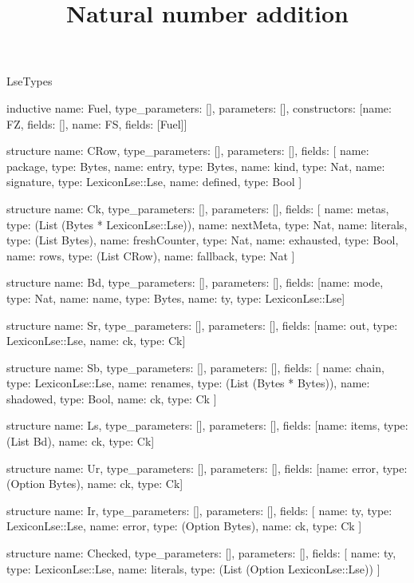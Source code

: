 \begin{lexlean}{LseTypes}
\title{Natural number addition}
\begin{semanticmodule}
inductive{
  name: Fuel,
  type_parameters: [],
  parameters: [],
  constructors: [{name: FZ, fields: []}, {name: FS, fields: [Fuel]}]
}

structure{
  name: CRow,
  type_parameters: [],
  parameters: [],
  fields: [
    {name: package, type: Bytes},
    {name: entry, type: Bytes},
    {name: kind, type: Nat},
    {name: signature, type: LexiconLse::Lse},
    {name: defined, type: Bool}
  ]
}

structure{
  name: Ck,
  type_parameters: [],
  parameters: [],
  fields: [
    {name: metas, type: (List (Bytes * LexiconLse::Lse))},
    {name: nextMeta, type: Nat},
    {name: literals, type: (List Bytes)},
    {name: freshCounter, type: Nat},
    {name: exhausted, type: Bool},
    {name: rows, type: (List CRow)},
    {name: fallback, type: Nat}
  ]
}

structure{
  name: Bd,
  type_parameters: [],
  parameters: [],
  fields: [{name: mode, type: Nat}, {name: name, type: Bytes}, {name: ty, type: LexiconLse::Lse}]
}

structure{
  name: Sr,
  type_parameters: [],
  parameters: [],
  fields: [{name: out, type: LexiconLse::Lse}, {name: ck, type: Ck}]
}

structure{
  name: Sb,
  type_parameters: [],
  parameters: [],
  fields: [
    {name: chain, type: LexiconLse::Lse},
    {name: renames, type: (List (Bytes * Bytes))},
    {name: shadowed, type: Bool},
    {name: ck, type: Ck}
  ]
}

structure{
  name: Ls,
  type_parameters: [],
  parameters: [],
  fields: [{name: items, type: (List Bd)}, {name: ck, type: Ck}]
}

structure{
  name: Ur,
  type_parameters: [],
  parameters: [],
  fields: [{name: error, type: (Option Bytes)}, {name: ck, type: Ck}]
}

structure{
  name: Ir,
  type_parameters: [],
  parameters: [],
  fields: [
    {name: ty, type: LexiconLse::Lse},
    {name: error, type: (Option Bytes)},
    {name: ck, type: Ck}
  ]
}

structure{
  name: Checked,
  type_parameters: [],
  parameters: [],
  fields: [
    {name: ty, type: LexiconLse::Lse},
    {name: literals, type: (List (Option LexiconLse::Lse))}
  ]
}


\end{semanticmodule}
\end{lexlean}
